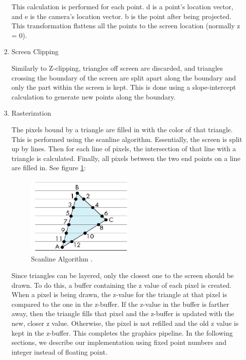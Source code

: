 \documentclass[onecolumn]{IEEEtran}
\begin{document}
\begin{enumerate}
This calculation is performed for each point.  d is a point's location vector, and e is the camera's location vector.  b is the point after being projected.  This transformation flattens all the points to the screen location (normally z = 0).
\item Screen Clipping

Similarly to Z-clipping, triangles off screen are discarded, and triangles crossing the boundary of the screen are split apart along the boundary and only the part within the screen is kept.  This is done using a slope-intercept calculation to generate new points along the boundary.

\item Rasterization

The pixels bound by a triangle are filled in with the color of that triangle.  This is performed using the scanline algorithm.  Essentially, the screen is split up by lines.  Then for each line of pixels, the intersection of that line with a triangle is calculated.  Finally, all pixels between the two end points on a line are filled in.  See figure \ref{fig:rasterization}:

\begin{figure}[H]
	\centering
	\includegraphics[width=0.50\textwidth]{rasterization.png}
	\caption{Scanline Algorithm \cite{rasterizer}.}
	\label{fig:rasterization}
\end{figure}


Since triangles can be layered, only the closest one to the screen should be drawn.  To do this, a buffer containing the z value of each pixel is created.  When a pixel is being drawn, the z-value for the triangle at that pixel is compared to the one in the z-buffer.  If the z-value in the buffer is farther away, then the triangle fills that pixel and the z-buffer is updated with the new, closer z value.  Otherwise, the pixel is not refilled and the old z value is kept in the z-buffer.  This completes the graphics pipeline.  In the following sections, we describe our implementation using fixed point numbers and integer instead of floating point.

\end{enumerate}
\end{document}

